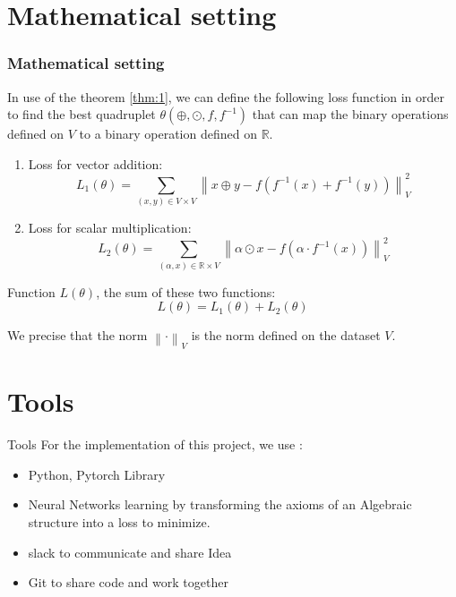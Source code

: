 \documentclass{beamer}
\begin{document}
    \section{Mathematical setting}
    \begin{frame}
        \frametitle{Mathematical setting}
        In use of the theorem \ref{thm:1}, we can define the following loss function in order to find the best  quadruplet ${\theta}(\oplus,\odot,f,f^{-1})$ that can map the binary operations defined on $V$ to a binary operation defined on $\mathbb{R}$.


        \begin{enumerate}
            \item Loss for vector addition:
            \[
                L_1(\theta) = \sum_{(x, y) \in V \times V} \left\lVert x \oplus y - f(f^{-1}(x) + f^{-1}(y))\right\rVert_{V}^2
            \]
            \item Loss for scalar multiplication:
            \[
                L_2(\theta) = \sum_{(\alpha, x) \in \mathbb{R} \times V} \left\lVert \alpha \odot x - f(\alpha \cdot f^{-1}(x)) \right\rVert_{V}^2
            \]
        \end{enumerate}
    
        Function $L(\theta)$, the sum of these two functions:
        \[
        L(\theta) = L_1(\theta) + L_2(\theta)
        \]
    
        We  precise that the norm $\left\lVert \cdot \right\rVert_{V}$ is the norm defined on the dataset $V$.
    \end{frame}


    
    \section{Tools}
    \begin{frame}{Tools}
        For the implementation of this project, we use :
        \begin{itemize}
            \item Python, Pytorch Library 
            \item Neural Networks learning by transforming the axioms of
            an Algebraic structure into a loss to minimize.
            \item slack to communicate and share Idea
            \item Git to share code and work together
        \end{itemize}
    \end{frame}
    
\end{document}

